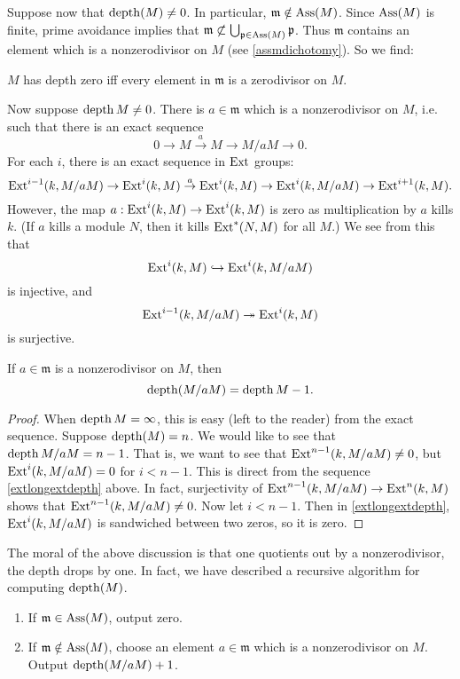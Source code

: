 Suppose now that $\operatorname{depth}(M) \neq 0$. In particular,
$\mathfrak{m} \notin
\operatorname{Ass}(M)$. Since $\operatorname{Ass}(M)$ is finite, prime avoidance implies that
$\mathfrak{m}
\not\subset \bigcup_{\mathfrak{p} \in \operatorname{Ass}(M)} \mathfrak{p}$.
Thus
$\mathfrak{m}$ contains an element which is a nonzerodivisor on
$M$ (see \cref{assmdichotomy}). So we find:

\begin{proposition} \label{depthzero}
$M$ has depth zero iff every element in $\mathfrak{m}$ is a
zerodivisor on $M$.
\end{proposition}

Now suppose $\operatorname{depth} M \neq 0$. There is $a \in \mathfrak{m}$
which is a
nonzerodivisor on $M$, i.e.  such that there is
an exact sequence
\[ 0 \to M \stackrel{a}{\to} M \to M/aM \to 0.  \]
For each $i$, there is an  exact sequence in $\operatorname{Ext}$ groups:
\begin{equation} \label{extlongextdepth}\operatorname{Ext}^{i-1}(k,M/aM) \to \operatorname{Ext}^i(k,M) \stackrel{a}{\to} \operatorname{Ext}^i(k,M)
\to \operatorname{Ext}^i(k,
M/aM) \to \operatorname{Ext}^{i+1}(k,M)  .\end{equation}
However, the map $a: \operatorname{Ext}^i(k,M) \to \operatorname{Ext}^i(k,M)$ is zero as
multiplication by $a$
kills $k$. (If $a$ kills a module $N$,
then it kills
$\operatorname{Ext}^*(N,M)$ for all $M$.) We see from this that
\[ \operatorname{Ext}^i(k,M) \hookrightarrow \operatorname{Ext}^i(k,M/aM)  \]
is injective, and
\[ \operatorname{Ext}^{i-1}(k, M/aM) \twoheadrightarrow \operatorname{Ext}^i(k,M)  \]
is surjective.

\begin{corollary} \label{depthdropsbyone}
If $a \in \mathfrak{m}$ is a nonzerodivisor on $M$, then
\[ \operatorname{depth}(M/aM) = \operatorname{depth} M -1.  \]
\end{corollary}
\begin{proof}
When $\operatorname{depth} M = \infty$, this is easy (left to the reader) from
the exact
sequence. Suppose $\operatorname{depth}(M) = n$. We would like to see that
$\operatorname{depth} M/aM =
n-1$. That is, we want to see that $\operatorname{Ext}^{n-1}(k,M/aM) \neq 0$,
but
$\operatorname{Ext}^i(k,M/aM) =
0$ for $i < n-1$. This is direct from the sequence \eqref{extlongextdepth} above.
In fact, surjectivity of $\operatorname{Ext}^{n-1}(k,M/aM) \to \operatorname{Ext}^n(k,M)$
shows that
$\operatorname{Ext}^{n-1}(k,M/aM) \neq 0$. Now let $i < n-1$. 
Then in \eqref{extlongextdepth}, $\operatorname{Ext}^i(k, M/aM)$ is sandwiched between two
zeros, so it is zero.
\end{proof}

The moral of the above discussion is that one quotients out by a nonzerodivisor, the depth drops by one.
In fact, we have described a recursive algorithm for computing
$\operatorname{depth}(M)$.
\begin{enumerate}
\item If $\mathfrak{m}  \in \operatorname{Ass}(M)$, output zero.
\item If $\mathfrak{m} \notin \operatorname{Ass}(M)$, choose an element $a
\in\mathfrak{m}$
which is a nonzerodivisor on $M$. Output $\operatorname{depth}(M/aM) +1$.
\end{enumerate}


